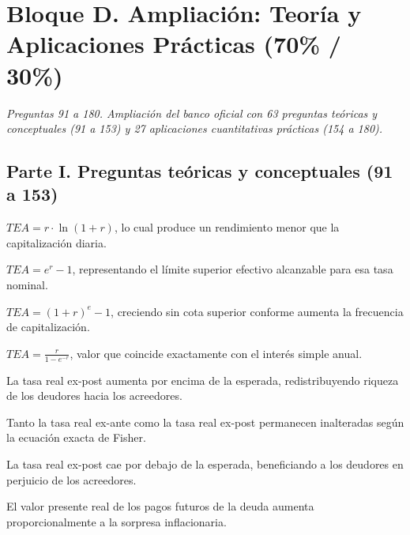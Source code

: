 \section*{Bloque D. Ampliación: Teoría y Aplicaciones Prácticas (70\% / 30\%)}

\noindent\textit{Preguntas 91 a 180. Ampliación del banco oficial con 63 preguntas teóricas y conceptuales (91 a 153) y 27 aplicaciones cuantitativas prácticas (154 a 180).}

\subsection*{Parte I. Preguntas teóricas y conceptuales (91 a 153)}

\begin{opts}
    \item $TEA = r \cdot \ln(1 + r)$, lo cual produce un rendimiento menor que la capitalización diaria.
    \item $TEA = e^{r} - 1$, representando el límite superior efectivo alcanzable para esa tasa nominal.
    \item $TEA = (1 + r)^e - 1$, creciendo sin cota superior conforme aumenta la frecuencia de capitalización.
    \item $TEA = \frac{r}{1 - e^{-r}}$, valor que coincide exactamente con el interés simple anual.
\end{opts}

\begin{opts}
    \item La tasa real ex-post aumenta por encima de la esperada, redistribuyendo riqueza de los deudores hacia los acreedores.
    \item Tanto la tasa real ex-ante como la tasa real ex-post permanecen inalteradas según la ecuación exacta de Fisher.
    \item La tasa real ex-post cae por debajo de la esperada, beneficiando a los deudores en perjuicio de los acreedores.
    \item El valor presente real de los pagos futuros de la deuda aumenta proporcionalmente a la sorpresa inflacionaria.
\end{opts}

